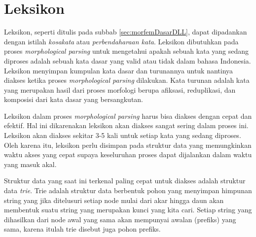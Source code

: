 %
%

\section{Leksikon}
\label{sec:leksikon}
Leksikon, seperti ditulis pada subbab \ref{sec:morfemDasarDLL}, dapat dipadankan dengan istilah \textit{kosakata} atau \textit{perbendaharaan kata}. Leksikon dibutuhkan pada proses \textit{morphological parsing} untuk mengetahui apakah sebuah kata yang sedang diproses adalah sebuah kata dasar yang valid atau tidak dalam bahasa Indonesia. Leksikon menyimpan kumpulan kata dasar dan turunannya untuk nantinya diakses ketika proses \textit{morphological parsing} dilakukan. Kata turunan adalah kata yang merupakan hasil dari proses morfologi berupa afiksasi, reduplikasi, dan komposisi dari kata dasar yang bersangkutan.

Leksikon dalam proses \textit{morphological parsing} harus bisa diakses dengan cepat dan efektif. Hal ini dikarenakan leksikon akan diakses sangat sering dalam proses ini. Leksikon akan diakses sekitar 3-5 kali untuk setiap kata yang sedang diproses. Oleh karena itu, leksikon perlu disimpan pada struktur data yang memungkinkan waktu akses yang cepat supaya keseluruhan proses dapat dijalankan dalam waktu yang masuk akal. 

Struktur data yang saat ini terkenal paling cepat untuk diakses adalah struktur data \textit{trie}. Trie adalah struktur data berbentuk pohon yang menyimpan himpunan string yang jika ditelusuri setiap node mulai dari akar hingga daun akan membentuk suatu string yang merupakan kunci yang kita cari. Setiap string yang dihasilkan dari node awal yang sama akan mempunyai awalan (prefiks) yang sama, karena itulah trie disebut juga pohon prefiks.

